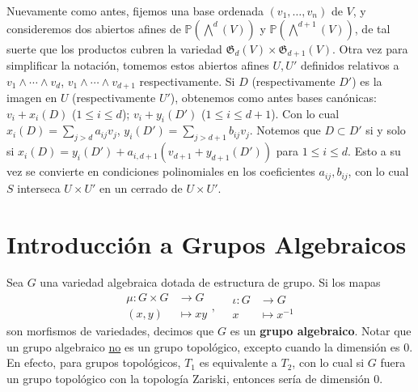\documentclass[spanish,12pt]{amsart}
\theoremstyle{definition}
\theoremstyle{remark}
\numberwithin{equation}{section}
\begin{document}
Nuevamente como antes, fijemos una base ordenada $(v_1, \ldots, v_n)$ de $V$, y consideremos dos abiertos afines de $\mathbb{P} (\bigwedge^d (V))$ y $\mathbb{P} (\bigwedge^{d+1} (V))$, de tal suerte que los productos cubren la variedad $\mathfrak G _d (V) \times \mathfrak G _{d+1} (V)$. Otra vez para simplificar la notación, tomemos estos abiertos afines $U, U'$ definidos relativos a $v_1 \wedge \cdots \wedge v_d$, $v_1 \wedge \cdots \wedge v_{d+1}$ respectivamente. Si $D$ (respectivamente $D'$) es la imagen en $U$ (respectivamente $U'$), obtenemos como antes bases canónicas: $v_i + x_i (D)$ ($1 \leq i \leq d$); $v_i + y_i (D')$ ($1\leq i \leq d+ 1$). Con lo cual $x_i (D) = \sum_{j > d} a_{ij} v_j$, $y_i (D') = \sum_{j > d+1} b_{ij} v_j$. Notemos que $D \subset D'$ si y solo si $x_i (D) = y_i (D') + a_{i, d+1} (v_{d+1} + y_{d+1} (D'))$ para $1 \leq i \leq d$. Esto a su vez se convierte en condiciones polinomiales en los coeficientes $a_{ij}, b_{ij}$, con lo cual $S$ interseca $U \times U'$ en un cerrado de $U \times U'$.





















\section{Introducción a Grupos Algebraicos}

Sea $G$ una variedad algebraica dotada de estructura de grupo. Si los mapas
\[
    \begin{array}{ll}
    \mu : G \times G &\longrightarrow G \\
    (x,y) &\longmapsto xy
    \end{array}, \quad
    \begin{array}{ll}
    \iota : G &\longrightarrow G \\
    x &\longmapsto x^{-1}
    \end{array}
\]
son morfismos de variedades, decimos que $G$ es un \textbf{grupo algebraico}. Notar que un grupo algebraico \underline{no} es un grupo topológico, excepto cuando la dimensión es $0$. En efecto, para grupos topológicos, $T_1$ es equivalente a $T_2$, con lo cual si $G$ fuera un grupo topológico con la topología Zariski, entonces sería de dimensión $0$.
\end{document}
